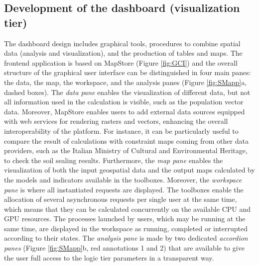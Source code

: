 \documentclass[APA,LATO1COL,doublespace]{WileyNJD-v2}
\newcommand{\update}[1]{\emph{\textcolor{blue}{#1}}}     %
\begin{document}
\subsection{Development of the dashboard (visualization tier) }
\label{sec:viewTier}
The dashboard design includes graphical tools, procedures to combine spatial data (analysis and visualization), and the production of tables and maps. 
The frontend application is based on MapStore (Figure \ref{fig:GCI}) and the overall structure of the graphical user interface can be distinguished in four main panes: the data, the map, the workspace, and the analysis panes (Figure \ref{fig:SMapp}a, dashed boxes).
The \textit{data pane} enables the visualization of different data, but not all information used in the calculation is visible, such as the population vector data. 
Moreover, MapStore enables users to add external data sources equipped with web services for rendering rasters and vectors, enhancing the overall interoperability of the platform. 
For instance, it can be particularly useful to compare the result of calculations with constraint maps coming from other data providers, such as the Italian Ministry of Cultural and Environmental Heritage, to check the soil sealing results. Furthermore, the \textit{map pane} enables the visualization of both the input geospatial data and the output maps calculated by the models and indicators available in the toolboxes. 
Moreover, the \textit{workspace pane} is where all instantiated requests are displayed. 
The toolboxes enable the allocation of several asynchronous requests per single user at the same time, which means that they can be calculated concurrently on the available CPU and GPU resources. 
The processes launched by users, which may be running at the same time, are displayed in the workspace as running, completed or interrupted according to their states. 
The \textit{analysis pane} is made by two dedicated \textit{accordion panes} (Figure \ref{fig:SMapp}b, red annotations 1 and 2) that are available to give the user full access to the logic tier parameters in a transparent way.
\end{document}

